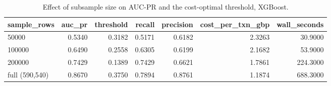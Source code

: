 \begin{table}
\caption{Effect of subsample size on AUC-PR and the cost-optimal threshold, XGBoost.}
\label{tab:table8_sample_size_ablation}
\begin{tabular}{lrrrrrr}
\toprule
sample\_rows & auc\_pr & threshold & recall & precision & cost\_per\_txn\_gbp & wall\_seconds \\
\midrule
50000 & 0.5340 & 0.3182 & 0.5171 & 0.6182 & 2.3263 & 30.9000 \\
100000 & 0.6490 & 0.2558 & 0.6305 & 0.6199 & 2.1682 & 53.9000 \\
200000 & 0.7429 & 0.1389 & 0.7429 & 0.6621 & 1.7861 & 224.3000 \\
full (590,540) & 0.8670 & 0.3750 & 0.7894 & 0.8761 & 1.1874 & 688.3000 \\
\bottomrule
\end{tabular}
\end{table}
